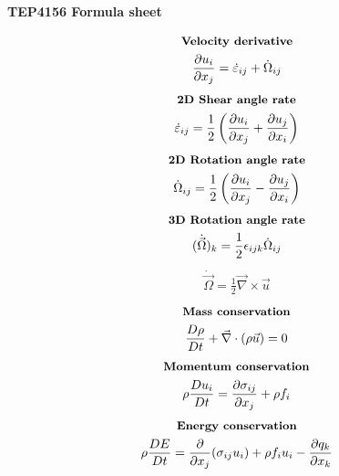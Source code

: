 \documentclass[10pt, a4paper]{article}
\newcommand{\derivative}[2]{\frac{\partial #1}{\partial #2}}
\begin{document}
\begin{center}
    \Large
    \textbf{TEP4156 Formula sheet}
    \vspace{0.5cm}
\end{center}

\begin{multicols*}{2}
    \begin{gather*}
        \textbf{\small Velocity derivative} \\
        \derivative{ u_i}{x_j} = \dot{\varepsilon}_{ij} + \dot{\Omega}_{ij}
    \end{gather*}
    \begin{gather*}
        \textbf{\small 2D Shear angle rate} \\ %
        \dot{\varepsilon}_{ij} = \frac12\left( \derivative{ u_i}{x_j} +
        \derivative{ u_j}{x_i}\right)
    \end{gather*}
    \begin{gather*}
        \textbf{\small 2D Rotation angle rate} \\
        \dot{\Omega}_{ij} = \frac12\left( \derivative{ u_i}{x_j} -
        \derivative{ u_j}{x_i}\right)
    \end{gather*}
    \begin{gather*}
        \textbf{\small 3D Rotation angle rate} \\
        (\dot{\vec{\Omega}})_k = \frac12 \epsilon_{ijk}\dot{\Omega}_{ij}
    \end{gather*}
    \begin{gather*}
        \dot{\vec{\Omega}} = \frac12 \vec{\nabla}\times\vec{u}
    \end{gather*}
    \begin{gather*}
        \textbf{\small Mass conservation} \\
        \frac{D\rho}{Dt} + \vec{\nabla} \cdot (\rho \vec{u}) = 0
    \end{gather*}
    \begin{gather*}
        \textbf{\small Momentum conservation} \\
        \rho \frac{Du_i}{Dt} = \derivative{ \sigma_{ij}}{x_j} + \rho f_i
    \end{gather*}
    \begin{gather*}
        \textbf{\small Energy conservation} \\
        \rho \frac{DE}{Dt} = \derivative{}{x_j}(\sigma_{ij} u_i) + \rho f_i u_i - \derivative{ q_k}{x_k}
    \end{gather*}

\end{multicols*}
\end{document}

